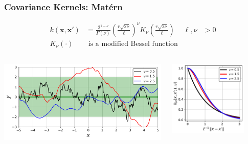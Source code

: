 \documentclass{beamer}
\newcommand{\vect}[1]{\boldsymbol{#1}}
\begin{document}
	\begin{frame}
		\frametitle{Covariance Kernels: Mat\'{e}rn}
		\begin{align*}
			k(\vect{x},\vect{x}') & =\frac{2^{1-\nu}}{\Gamma(\nu)}\left(\frac{r\sqrt{2\nu}}{\ell}\right)^\nu K_\nu\left(\frac{r\sqrt{2\nu}}{\ell}\right) & \ell,\nu & >0\\
			K_\nu(\cdot) & \text{ is a modified Bessel function} 
		\end{align*}
		\begin{columns}
			\begin{column}{0.6\textwidth}
				\includegraphics[width=\textwidth]{figures/03c_matern_sample.pdf}
			\end{column}
			\hfill
			\begin{column}{0.4\textwidth}
				\begin{center}
					\includegraphics[width=0.8\textwidth]{figures/03c_matern.pdf}
				\end{center}
			\end{column}
		\end{columns}
	\end{frame}
\end{document}
